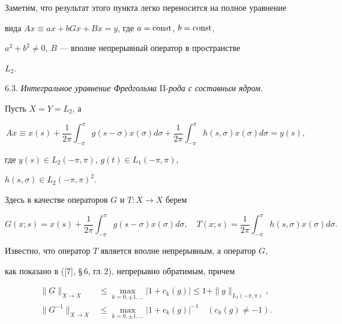 Заметим, что результат этого пункта легко переносится на полное уравнение


вида $Ax\equiv ax+bGx+Bx=y$, где $a=\operatorname{const}$, $b=\operatorname{const}$,


$a^2+b^2\ne 0$, $B$ --- вполне непрерывный оператор в пространстве


$L_2$.


\smallskip





6.3. {\it Интегральное уравнение Фредгольма} II-{\it рода с составным ядром.} 


Пусть $X=Y=L_2$, а


\begin{equation}


Ax \equiv x(s)+\frac{1}{2\pi}\int_{-\pi}^{\pi}g(s-\sigma)x(\sigma)d\sigma+


\frac{1}{2\pi}\int_{-\pi}^{\pi}h(s,\sigma)x(\sigma)d\sigma=y(s),


\end{equation}


где $y(s) \in L_2(-\pi,\pi)$, $g(t)\in L_1(-\pi,\pi)$,


$h(s,\sigma) \in L_2(-\pi,\pi)^2$.





Здесь в качестве операторов $G$ и $T:X\to X$ берем


\begin{equation}


G(x;s)=x(s)+\frac{1}{2\pi}\int_{-\pi}^{\pi}g(s-\sigma)x(\sigma)d\sigma,\quad


T(x;s)=\frac{1}{2\pi}\int_{-\pi}^{\pi}h(s,\sigma)x(\sigma)d\sigma.


\end{equation}


Известно, что оператор $T$ является вполне непрерывным, а оператор $G$,


как показано в ([7], \S\,6, гл.\,2), непрерывно обратимым, причем


\begin{align*}


\|G\|_{X\to X} &\le \max_{k=0,\pm1,\dotsc}|1+c_k(g)| \le 1+


\|g\|_{L_1(-\pi,\pi)},\\


\|G^{-1}\|_{X\to X} &\le \max_{k=0,\pm1,\dotsc}|1+c_k(g)|^{-1} \quad


(c_k(g)\ne -1).


\end{align*}


